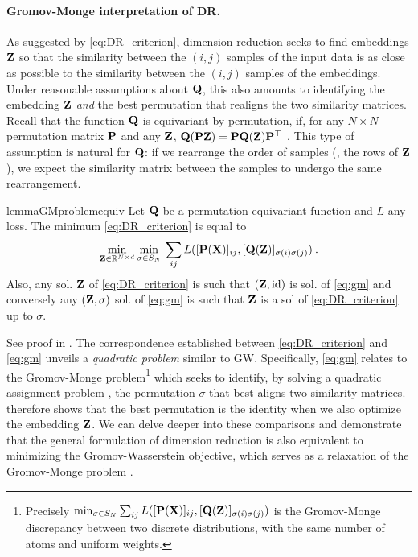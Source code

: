 \paragraph{Gromov-Monge interpretation of DR.} As suggested by
\cref{eq:DR_criterion}, dimension reduction seeks to find embeddings ${\mathbf{Z}}$ so
that the similarity between the $(i,j)$ samples of the input data is as close as
possible to the similarity between the $(i,j)$ samples of the embeddings. Under
reasonable assumptions about ${\mathbf{Q}}$, this also amounts to identifying the embedding ${\mathbf{Z}}$ \emph{and} the best permutation that realigns the two similarity matrices. %
Recall that the function ${\mathbf{Q}}$ is equivariant by permutation, if, for any $N \times N$ permutation matrix ${\mathbf{P}}$ and any
${\mathbf{Z}}$, ${\mathbf{Q}}({\mathbf{P}} {\mathbf{Z}}) = {\mathbf{P}} {\mathbf{Q}}({\mathbf{Z}}) {\mathbf{P}}^\top$ \cite{bronstein2021geometric}.
This type of assumption is natural for ${\mathbf{Q}}$: if we rearrange the order of
samples (\ie, the rows of ${\mathbf{Z}}$), we expect the similarity matrix between the
samples to undergo the same rearrangement. 
\begin{restatable}{lemma}{GMproblemequiv}
\label{lemma:GMproblemequiv}
Let ${\mathbf{Q}}$ be a permutation equivariant function and $L$ any loss. The minimum \cref{eq:DR_criterion} is equal to 
\begin{equation}
\label{eq:gm}
\min_{{\mathbf{Z}} \in \mathbb{R}^{N \times d}} \min_{\sigma \in S_N} \: \sum_{ij} L([{\mathbf{P}}({\mathbf{X}})]_{ij}, [{\mathbf{Q}}({\mathbf{Z}})]_{\sigma(i) \sigma(j)}) \:.
\end{equation}
Also, any sol. ${\mathbf{Z}}$ of \cref{eq:DR_criterion} is such that $({\mathbf{Z}}, \operatorname{id})$ is sol. of \cref{eq:gm} and conversely any $({\mathbf{Z}}, \sigma)$ sol. of \cref{eq:gm} is such that ${\mathbf{Z}}$ is a sol of \cref{eq:DR_criterion} up to $\sigma$.
\end{restatable}
See proof in . The correspondence established between \cref{eq:DR_criterion} and \cref{eq:gm}
unveils a \emph{quadratic problem} similar to GW. Specifically, \cref{eq:gm} relates to
the Gromov-Monge problem\footnote{Precisely $\min_{\sigma \in S_N} \sum_{ij} L([{\mathbf{P}}({\mathbf{X}})]_{ij}, [{\mathbf{Q}}({\mathbf{Z}})]_{\sigma(i) \sigma(j)})$ is the Gromov-Monge discrepancy between two discrete distributions, with the same number of atoms and uniform weights.}
\cite{memoli2018gromov} which seeks to identify, by solving a quadratic assignment problem \cite{cela2013quadratic}, the permutation $\sigma$ that best
aligns two similarity matrices.  therefore shows that the best permutation is the identity when we also optimize the embedding ${\mathbf{Z}}$.
We can delve deeper into these comparisons and demonstrate that the general formulation of dimension reduction is also equivalent to minimizing the Gromov-Wasserstein objective, which serves as a relaxation of the Gromov-Monge problem \cite{memoli2022comparison}.


